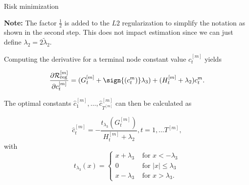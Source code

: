 \documentclass[11pt,compress,t,notes=noshow, xcolor=table]{beamer}
\begin{document}
\begin{vbframe}{Risk minimization}
    \lz

    \textbf{Note:} The factor $\frac12$ is added to the $L2$ regularization to simplify the notation as shown in the second step.
    This does not impact estimation since we can just define $\lambda_2 = 2\tilde\lambda_2$.

    \framebreak

    Computing the derivative for a terminal node constant value $c^{[m]}_t$ yields

    $$
    \frac{\partial \riskr^{[m]}}{\partial c^{[m]}_t} = (G^{[m]}_t + \sign{(c^{m}_t)}\lambda_3) + (H^{[m]}_t + \lambda_2) c^{m}_t.
    $$

    The optimal constants $\hat{c}^{[m]}_1,\dots, \hat{c}^{[m]}_{T^{[m]}}$ can then be calculated as

    \lz
    $$
    \hat{c}^{[m]}_t = - \frac{t_{\lambda_3}\left(G^{[m]}_t\right)}{H^{[m]}_t + \lambda_2}, t=1,\dots T^{[m]},
    $$
    with $$t_{\lambda_3}(x) = \begin{cases}
      x + \lambda_3 &\text{ for } x < - \lambda_3 \\
      0  &\text{ for } |x| \leq \lambda_3 \\
      x - \lambda_3 &\text{ for } x > \lambda_3.
    \end{cases}$$

    \end{vbframe}
\end{document}
